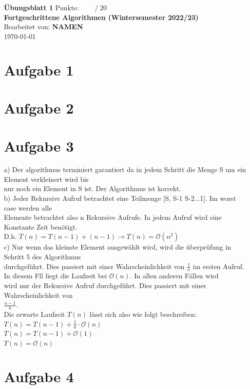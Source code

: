 \documentclass[a4paper]{scrartcl}
\def\to{\ensuremath{\rightarrow}} %
\def\Oh{\ensuremath{\mathcal{O}}} %
\def\sheetNumber{1}
\def\names{NAMEN}
\def\sumPoints{20}
\begin{document}
 

\begin{doublespace} %
\noindent \textbf{\LARGE{Übungsblatt \sheetNumber}}
\hfill  {\large Punkte: $\boxed{\qquad  /\; \sumPoints}$}\\
{\Large \textbf{Fortgeschrittene Algorithmen (Wintersemester 2022/23)}\\
Bearbeitet von: \textbf{\names}\\
\today}
\end{doublespace}


\section*{Aufgabe 1}

\section*{Aufgabe 2}

\section*{Aufgabe 3}
a) Der algorithmus terminiert garantiert da in jedem Schritt die Menge S um ein Element verkleinert wird bis \\
nur noch ein Element in S ist. Der Algorithmus ist korrekt.\\

b) Jeder Rekursive Aufruf betrachtet eine Teilmenge [S, S-1 S-2...1]. Im worst case werden alle \\
Elemente betrachtet also n Rekursive Aufrufe. In jedem Aufruf wird eine Konstante Zeit benötigt. \\
D.h. $T (n) = T (n-1) + (n - 1) \to T (n) = \Oh (n^2)$ \\

c) Nur wenn das kleinste Element ausgewählt wird, wird die überprüfung in Schritt 5 des Algorithmus \\
durchgeführt. Dies passiert mit einer Wahrscheinlichkeit von $\frac{1}{n}$ im ersten Aufruf. \\
In diesem Fll liegt die Laufzeit bei $\Oh (n)$. In allen anderen Fällen wird \\
wird nur der Rekursive Aufruf durchgeführt. Dies passiert mit einer Wahrscheinlichkeit von \\
$\frac{n-1}{n}$. \\
Die erwarte Laufzeit $T (n)$ lässt sich also wie folgt beschreiben: \\
$T(n) = T(n-1) + \frac{1}{n} \cdot \Oh (n)$ \\
$T(n) = T(n-1) + \Oh (1)$ \\
$T(n) = \Oh (n)$ \\
\section*{Aufgabe 4}


\end{document}
